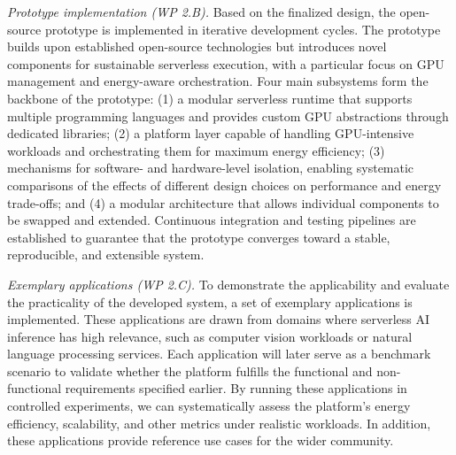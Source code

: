 \emph{Prototype implementation (WP 2.B).}
Based on the finalized design, the open-source prototype is implemented in iterative development cycles.
The prototype builds upon established open-source technologies but introduces novel components for sustainable serverless execution, with a particular focus on GPU management and energy-aware orchestration.
Four main subsystems form the backbone of the prototype: (1) a modular serverless runtime that supports multiple programming languages and provides custom GPU abstractions through dedicated libraries; (2) a platform layer capable of handling GPU-intensive workloads and orchestrating them for maximum energy efficiency; (3) mechanisms for software- and hardware-level isolation, enabling systematic comparisons of the effects of different design choices on performance and energy trade-offs; and (4) a modular architecture that allows individual components to be swapped and extended.
Continuous integration and testing pipelines are established to guarantee that the prototype converges toward a stable, reproducible, and extensible system.

\emph{Exemplary applications (WP 2.C).}
To demonstrate the applicability and evaluate the practicality of the developed system, a set of exemplary applications is implemented.
These applications are drawn from domains where serverless AI inference has high relevance, such as computer vision workloads or natural language processing services.
Each application will later serve as a benchmark scenario to validate whether the platform fulfills the functional and non-functional requirements specified earlier.
By running these applications in controlled experiments, we can systematically assess the platform's energy efficiency, scalability, and other metrics under realistic workloads.
In addition, these applications provide reference use cases for the wider community.


